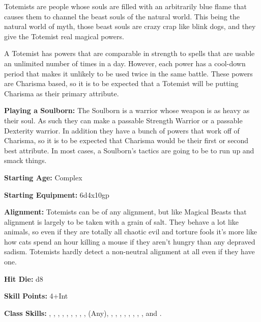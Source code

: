
Totemists are people whose souls are filled with an arbitrarily blue flame that causes them to channel the beast souls of the natural world. This being the natural world of myth, those beast souls are crazy crap like blink dogs, and they give the Totemist real magical powers. 

A Totemist has powers that are comparable in strength to spells that are usable an unlimited number of times in a day. However, each power has a cool-down period that makes it unlikely to be used twice in the same battle. These powers are Charisma based, so it is to be expected that a Totemist will be putting Charisma as their primary attribute. 

\textbf{Playing a Soulborn:} The Soulborn is a warrior whose weapon is as heavy as their soul. As such they can make a passable Strength Warrior or a passable Dexterity warrior. In addition they have a bunch of powers that work off of Charisma, so it is to be expected that Charisma would be their first or second best attribute. In most cases, a Soulborn's tactics are going to be to run up and smack things. 

\textbf{Starting Age:} Complex

\textbf{Starting Equipment:} 6d4x10gp 

\textbf{Alignment:} Totemists can be of any alignment, but like Magical Beasts that alignment is largely to be taken with a grain of salt. They behave a lot like animals, so even if they are totally all chaotic evil and torture fools it's more like how cats spend an hour killing a mouse if they aren't hungry than any depraved sadism. Totemists hardly detect a non-neutral alignment at all even if they have one. 

\textbf{Hit Die:} d8

\modebab{}

\poorfor{}
\poorref{}
\goodwil{}

\textbf{Skill Points:} 4+Int 

\textbf{Class Skills:} , , , , , , , , ,  (Any), , , , , , , , , and .

